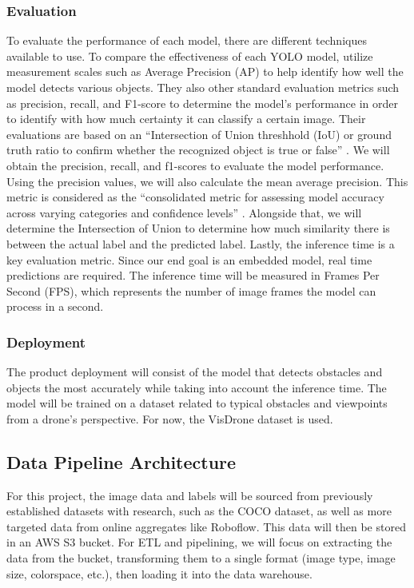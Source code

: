 \documentclass[stu,12pt,floatsintext]{apa7}
\begin{document}
\subsubsection{Evaluation}
To evaluate the performance of each model, there are different techniques available to use. To compare the effectiveness of each YOLO model, \textcite{quach_evaluating_2023} utilize measurement scales such as Average Precision (AP) to help identify how well the model detects various objects. They also other standard evaluation metrics such as precision, recall, and F1-score to determine the model's performance in order to identify with how much certainty it can classify a certain image. Their evaluations are based on an ``Intersection of Union threshhold (IoU) or ground truth ratio to confirm whether the recognized object is true or false'' \parencite{quach_evaluating_2023}. We will obtain the precision, recall, and f1-scores to evaluate the model performance. Using the precision values, we will also calculate the mean average precision. This metric is considered as the ``consolidated metric for assessing model accuracy across varying categories and confidence levels'' \parencite{safaldin_improved_2024}. Alongside that, we will determine the Intersection of Union to determine how much similarity there is between the actual label and the predicted label. Lastly, the inference time is a key evaluation metric. Since our end goal is an embedded model, real time predictions are required. The inference time will be measured in Frames Per Second (FPS), which represents the number of image frames the model can process in a second.

\subsubsection{Deployment}
The product deployment will consist of the model that detects obstacles and objects the most accurately while taking into account the inference time. The model will be trained on a dataset related to typical obstacles and viewpoints from a drone's perspective. For now, the VisDrone dataset is used.


\subsection{Data Pipeline Architecture}

For this project, the image data and labels will be sourced from previously established datasets with research, such as the COCO dataset, as well as more targeted data from online aggregates like Roboflow. This data will then be stored in an AWS S3 bucket. For ETL and pipelining, we will focus on extracting the data from the bucket, transforming them to a single format (image type, image size, colorspace, etc.), then loading it into the data warehouse.
\end{document}
